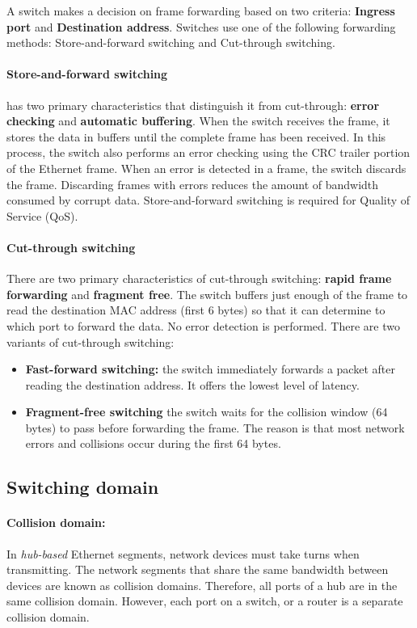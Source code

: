 A switch makes a decision on frame forwarding based on two criteria: \textbf{Ingress port} and \textbf{Destination address}. Switches use one of the following forwarding methods:  Store-and-forward switching and Cut-through switching.

\paragraph{Store-and-forward switching} has two primary characteristics that distinguish it from cut-through: \textbf{error checking} and \textbf{automatic buffering}. When the switch receives the frame, it stores the data in buffers until the complete frame has been received. In this process, the switch also performs an error checking using the CRC trailer portion of the Ethernet frame. When an error is detected in a frame, the switch discards the frame. Discarding frames with errors reduces the amount of bandwidth consumed by corrupt data. Store-and-forward switching is required for Quality of Service (QoS).

\paragraph{Cut-through switching}  There are two primary characteristics of cut-through switching: \textbf{rapid frame forwarding} and \textbf{fragment free}. The switch buffers just enough of the frame to read the destination MAC address (first 6 bytes) so that it can determine to which port to forward the data. No error detection is performed. There are two variants of cut-through switching: 

\begin{itemize}
\item \textbf{Fast-forward switching:} the switch immediately forwards a packet after reading the destination address. It offers the lowest level of latency. 

\item \textbf{Fragment-free switching} the switch waits for the collision window (64 bytes) to pass before forwarding the frame. The reason is that most network errors and collisions occur during the first 64 bytes. 
\end{itemize}

\subsection{Switching domain}

\paragraph{Collision domain:} In \emph{hub-based} Ethernet segments, network devices must take turns when transmitting. The network segments that share the same bandwidth between devices are known as collision domains. Therefore, all ports of a hub are in the same collision domain. However, each port on a switch, or a router is a separate collision domain.

